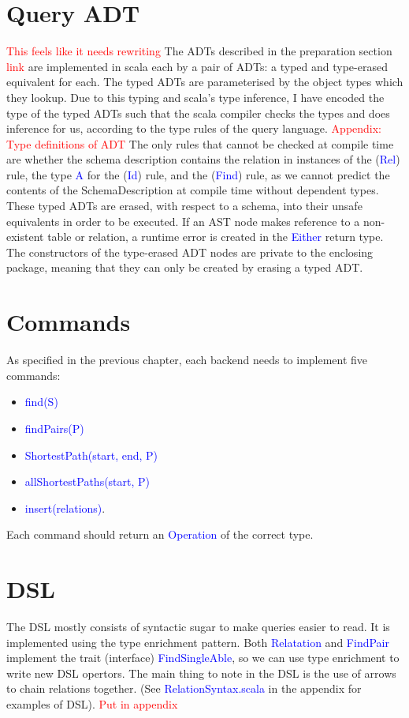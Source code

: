 \documentclass[12pt,a4paper,twoside,openright]{report}
\newcommand\todo[1]{\textcolor{red}{#1}}
\newcommand\codeName[1]{\textcolor{blue}{#1}}
\begin{document}
\section{Query ADT}
	\todo{This feels like it needs rewriting}
The ADTs described in the preparation section \todo{link}	are implemented in scala each by a pair of ADTs: a typed and type-erased equivalent for each. The typed ADTs are parameterised by the object types which they lookup. Due to this typing and scala’s type inference, I have encoded the type of the typed ADTs such that the scala compiler checks the types and does inference for us, according to the type rules of the query language. \todo{Appendix: Type definitions of ADT} The only rules that cannot be checked at compile time are whether the schema description contains the relation in instances of the (\codeName{Rel}) rule, the type \codeName{A} for the (\codeName{Id}) rule, and the (\codeName{Find}) rule, as we cannot predict the contents of the SchemaDescription at compile time without dependent types.  These typed ADTs are erased,  with respect to a schema,  into their unsafe equivalents in order to be executed. If an AST node makes reference to a non-existent table or relation, a runtime error is created in the \codeName{Either} return type. The constructors of the type-erased ADT nodes are private to the enclosing package, meaning that they can only be created by erasing a typed ADT.
	
\section{Commands}
As specified in the previous chapter, each backend needs to implement five commands: 
\begin{itemize}
\item \codeName{find(S)}
\item \codeName{findPairs(P)}
\item \codeName{ShortestPath(start, end, P)}
\item \codeName{allShortestPaths(start, P)}
\item \codeName{insert(relations)}.
\end{itemize}
Each command should return an \codeName{Operation} of the correct type.
\section{DSL}
The DSL mostly consists of syntactic sugar to make queries easier to read. It is implemented using the type enrichment pattern. Both \codeName{Relatation} and \codeName{FindPair} implement the trait (interface) \codeName{FindSingleAble}, so we can use type enrichment to write new DSL opertors. The main thing to note in the DSL is the use of arrows to chain relations together. (See \codeName{RelationSyntax.scala} in the appendix for examples of DSL). \todo{Put in appendix}
\end{document}
